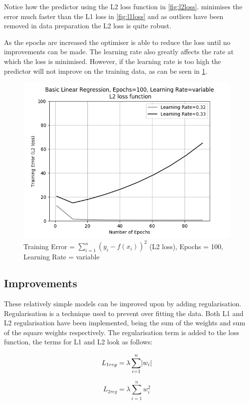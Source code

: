 \documentclass[10pt,twocolumn,letterpaper]{article}
\DeclarePairedDelimiter\abs{\lvert}{\rvert}%
\begin{document}
Notice how the predictor using the L2 loss function in \ref{fig:l2loss}. minimises the error much faster than the L1 loss in \ref{fig:l1loss} and as outliers have been removed in data preparation the L2 loss is quite robust.

As the epochs are increased the optimiser is able to reduce the loss until no improvements can be made. The learning rate also greatly affects the rate at which the loss is minimised. However, if the learning rate is too high the predictor will not improve on the training data, as can be seen in \ref{fig:break}.

\begin{figure}[h]
	\begin{center}
		\includegraphics[width=0.9\linewidth]{img/linrbreak.png}
	\end{center}
	\caption{Training Error = $\sum_{i = 1}^{n} (y_i - f(x_i))^2$ (L2 loss), Epochs = 100, Learning Rate = variable}
	\label{fig:break}
\end{figure}

\subsection{Improvements}
These relatively simple models can be improved upon by adding regularisation. Regularisation is a technique used to prevent over fitting the data. Both L1 and L2 regularisation have been implemented, being the sum of the weights and sum of the square weights respectively. The regularisation term is added to the loss function, the terms for L1 and L2 look as follows:

\noindent\begin{minipage}{.5\linewidth}
	\begin{equation}
	L_{1reg} = \lambda \sum_{i = 1}^{n} \abs{w_i}
	\end{equation}
\end{minipage}%
\begin{minipage}{.5\linewidth}
	\begin{equation}
	L_{2reg} = \lambda \sum_{i = 1}^{n} w_i^2
	\end{equation}
\end{minipage}
\end{document}
